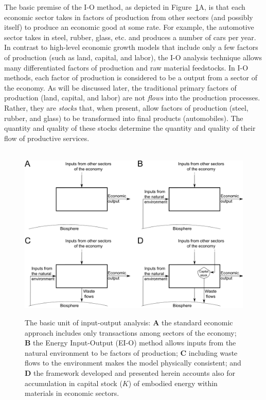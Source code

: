 The basic premise of the I-O method, 
as depicted in Figure~\ref{fig:basic_unit}A, 
is that each economic sector takes in factors of production 
from other sectors (and possibly itself) 
to produce an economic good at some rate. 
For example, the automotive sector takes in steel, rubber, glass, etc. 
and produces a number of cars per year. 
In contrast to high-level economic growth models 
that include only a few factors of production (such as land, capital, and labor), 
the I-O analysis technique allows many differentiated factors of production 
and raw material feedstocks.\cite{Costanza:1980ww} 
In I-O methods, each factor of production 
is considered to be a output from a sector of the economy. 
As will be discussed later,
the traditional primary factors of production (land, capital, and labor) 
are not \emph{flows} into the production processes. 
Rather, they are \emph{stocks} that, when present, 
allow factors of production (steel, rubber, and glass) 
to be transformed into final products (automobiles). 
The quantity and quality of these stocks 
determine the quantity and quality of their flow of productive services.

\begin{figure}[!ht]
\centering\
\includegraphics[width=\linewidth]{Part_0/Chapter_Introduction/images/Basic_unit_square.pdf}
\caption[The basic unit of input-output analysis]{The basic unit 
of input-output analysis: 
\textbf{A} the standard economic approach includes only transactions 
among sectors of the economy; 
\textbf{B} the Energy Input-Output (EI-O) method allows inputs 
from the natural environment to be factors of production; 
\textbf{C} including waste flows to the environment makes the model physically consistent; and
\textbf{D} the framework developed and presented herein accounts also for accumulation
in capital stock ($K$) of embodied energy within materials in economic sectors.}
\label{fig:basic_unit}
\end{figure}

